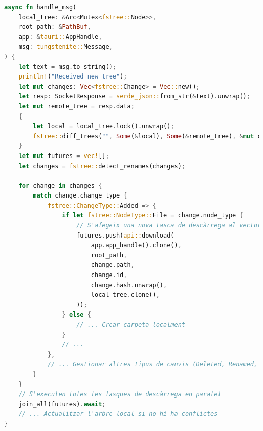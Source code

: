 \begin{lstlisting}[language=Rust, caption={Processament de missatges WebSocket a \texttt{synchronizer.rs}}]
async fn handle_msg(
    local_tree: &Arc<Mutex<fstree::Node>>,
    root_path: &PathBuf,
    app: &tauri::AppHandle,
    msg: tungstenite::Message,
) {
    let text = msg.to_string();
    println!("Received new tree");
    let mut changes: Vec<fstree::Change> = Vec::new();
    let resp: SocketResponse = serde_json::from_str(&text).unwrap();
    let mut remote_tree = resp.data;
    {
        let local = local_tree.lock().unwrap();
        fstree::diff_trees("", Some(&local), Some(&remote_tree), &mut changes);
    }
    let mut futures = vec![];
    let changes = fstree::detect_renames(changes);
    
    for change in changes {
        match change.change_type {
            fstree::ChangeType::Added => {
                if let fstree::NodeType::File = change.node_type {
                    // S'afegeix una nova tasca de descàrrega al vector de futures
                    futures.push(api::download(
                        app.app_handle().clone(),
                        root_path,
                        change.path,
                        change.id,
                        change.hash.unwrap(),
                        local_tree.clone(),
                    ));
                } else {
                    // ... Crear carpeta localment
                }
                // ...
            },
            // ... Gestionar altres tipus de canvis (Deleted, Renamed, Modified)
        }
    }
    // S'executen totes les tasques de descàrrega en paralel
    join_all(futures).await;
    // ... Actualitzar l'arbre local si no hi ha conflictes
}
\end{lstlisting}

